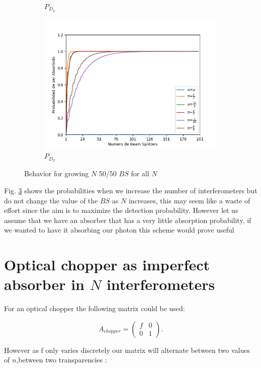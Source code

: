 \documentclass{book}
\begin{document}
\begin{figure}[!htb]
\begin{subfigure}[b]{0.45\linewidth}
\caption{$P_{D_{2}}$}
\label{fig:westminster_aerea}
\end{subfigure}
\begin{subfigure}[b]{0.45\linewidth}
\includegraphics[width=\linewidth]{images/BsFijo_azumaabs.png}
\caption{$P_{D_{2}}$}
\label{fig:BS1}
\end{subfigure}
\caption{Behavior for growing $N$ 50/50 $BS$ for all $N$}
\label{Azuma2}
\end{figure}
 
 Fig. \ref{Azuma2} shows the probabilities when we increase the number of interferometers but do not change the value of the $BS$ as $N$ increases, this may seem like a waste of effort since the aim is to maximize the detection probability. However let us assume that we have an absorber that has a very little absorption probability, if we wanted to have it absorbing our photon this scheme would prove useful

\section{Optical chopper as imperfect absorber in $N$ interferometers}
For an optical chopper the following matrix could be used:

\begin{equation}
A_{chopper}=\begin{pmatrix} f & 0 \\ 0 & 1 \end{pmatrix}.
\end{equation}

However as f only varies discretely our matrix will alternate between two values of $n$,between two transparencies :
\end{document}
